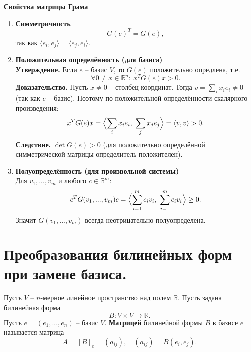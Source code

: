 \documentclass[14pt]{extreport}
\begin{document}
    \begin{defbox}
        \textbf{Свойства матрицы Грама}
        \begin{enumerate}
            \item \textbf{Симметричность}
            \[
            G(e)^T = G(e),
            \]
            так как $\langle e_i,e_j \rangle = \langle e_j,e_i \rangle$.

            \item \textbf{Положительная определённость (для базиса)} \\
            \textbf{Утверждение.} Если $e$ – базис $V$, то $G(e)$ положительно опредлена, т.е.
            \[
            \forall 0 \neq x \in \mathbb{R}^n:\ x^TG(e)x > 0.
            \]
            \textbf{Доказательство.} Пусть $x \neq 0$ – столбец-координат. Тогда $v = \sum_i x_ie_i \neq 0$ (так как $e$ – базис). Поэтому по положительной определённости скалярного произведения:
            \[
            x^TG(e)x = \Bigl\langle \sum_i x_ie_i,\ \sum_j x_je_j \Bigr\rangle = \langle v,v \rangle > 0.
            \]
            \textbf{Следствие.} $\det G(e) > 0$ (для положительно определённой симметрической матрицы определитель положителен).

            \item \textbf{Полуопределённость (для произвольной системы)} \\
            Для $v_1,...,v_m$ и любого $c \in \mathbb{R}^m$:
            \[
            c^TG(v_1,...,v_m)c = \Bigl\langle \sum_{i=1}^m c_iv_i,\ \sum_{i=1}^m c_iv_i \Bigr\rangle \geq 0.
            \]
            Значит $G(v_1,...,v_m)$ всегда неотрицательно полуопределена.
        \end{enumerate}
    \end{defbox}



    \chapter{Преобразования билинейных форм при замене базиса.}

    \begin{defbox}
        Пусть $V$ – $n$-мерное линейное пространство над полем $\mathbb{R}$. Пусть задана билинейная форма
        \[
        B: V \times V \rightarrow \mathbb{R}.
        \]
        Пусть $e = (e_1,...,e_n)$ – базис $V$. \textbf{Матрицей} билинейной формы $B$ в базисе $e$ называется матрица
        \[
        A = [B]_e = (a_{ij}), \quad (a_{ij}) = B(e_i,e_j).
        \]
    \end{defbox}
\end{document}
